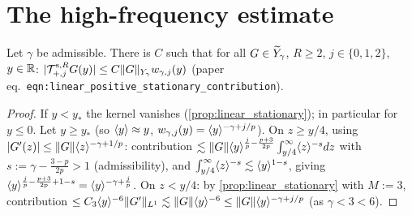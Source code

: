 \section{The high-frequency estimate}

\begin{lemma}
  \label{lem:c09_stationary_contribution}
  Let $\gamma$ be admissible. There is $C$ such that for all $G\in\widetilde{Y}_\gamma$, $R\ge2$, $j\in\{0,1,2\}$, $y\in\mathbb{R}$:
  $|\mathcal{T}^{\textup{s},R}_{+,j}G(y)|\le C\|G\|_{Y_\gamma}w_{\gamma,j}(y)$ (paper eq.~\texttt{eqn:linear\_positive\_stationary\_contribution}).
\end{lemma}
\begin{proof}
  If $y<y_*$ the kernel vanishes (\cref{prop:linear_stationary}); in particular for $y\le0$. Let $y\ge y_*$ (so $\langle y \rangle\approx y$, $w_{\gamma,j}(y)=\langle y \rangle^{-\gamma+j/p}$).
  On $z\ge y/4$, using $|G'(z)|\le\|G\|\langle z \rangle^{-\gamma+1/p}$: contribution $\lesssim\|G\|\langle y \rangle^{\frac jp-\frac{p+3}{2p}}\int_{y/4}^\infty\langle z \rangle^{-s}dz$ with
  $s:=\gamma-\frac{3-p}{2p}>1$ (admissibility), and $\int_{y/4}^\infty\langle z \rangle^{-s}\lesssim\langle y \rangle^{1-s}$, giving $\langle y \rangle^{\frac jp-\frac{p+3}{2p}+1-s}=\langle y \rangle^{-\gamma+\frac jp}$.
  On $z<y/4$: by \cref{prop:linear_stationary} with $M:=3$, contribution $\le C_3\langle y \rangle^{-6}\|G'\|_{L^1}\lesssim\|G\|\langle y \rangle^{-6}\le\|G\|\langle y \rangle^{-\gamma+j/p}$ (as $\gamma<3<6$).
\end{proof}

